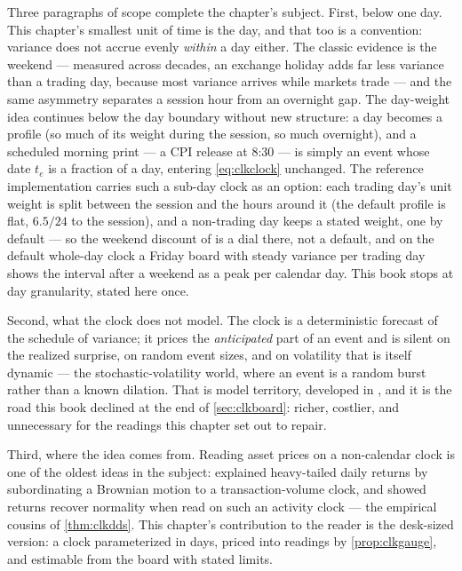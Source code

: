 Three paragraphs of scope complete the chapter's subject.  First,
below one day.  This chapter's smallest unit of time is the day, and
that too is a convention: variance does not accrue evenly
\emph{within} a day either.  The classic evidence is the weekend ---
measured across decades, an exchange holiday adds far less variance
than a trading day, because most variance arrives while markets
trade \citep{FrenchRoll1986} --- and the same asymmetry separates a
session hour from an overnight gap.  The day-weight idea continues
below the day boundary without new structure: a day becomes a
profile (so much of its weight during the session, so much
overnight), and a scheduled morning print --- a CPI release at 8:30
--- is simply an event whose date $t_e$ is a fraction of a day,
entering \eqref{eq:clkclock} unchanged.  The reference implementation
carries such a sub-day clock as an option: each trading day's unit
weight is split between the session and the hours around it (the
default profile is flat, $6.5/24$ to the session), and a non-trading
day keeps a stated weight, one by default --- so the weekend
discount of \citet{FrenchRoll1986} is a dial there, not a default,
and on the default whole-day clock a Friday board with steady
variance per trading day shows the interval after a weekend as a
peak per calendar day.  This book stops at day granularity,
stated here once.

Second, what the clock does not model.  The clock is a deterministic
forecast of the schedule of variance; it prices the \emph{anticipated}
part of an event and is silent on the realized surprise, on random
event sizes, and on volatility that is itself dynamic --- the
stochastic-volatility world, where an event is a random burst rather
than a known dilation.  That is model territory, developed in
\citet{Bergomi2016}, and it is the road this book declined at the end
of \cref{sec:clkboard}: richer, costlier, and unnecessary for the
readings this chapter set out to repair.

Third, where the idea comes from.  Reading asset prices on a
non-calendar clock is one of the oldest ideas in the subject:
\citet{Clark1973} explained heavy-tailed daily returns by
subordinating a Brownian motion to a transaction-volume clock, and
\citet{AneGeman2000} showed returns recover normality when read on
such an activity clock --- the empirical cousins of
\cref{thm:clkdds}.  This chapter's contribution to the reader is the
desk-sized version: a clock parameterized in days, priced into
readings by \cref{prop:clkgauge}, and estimable from the board with
stated limits.

